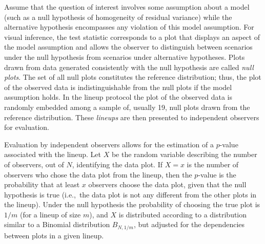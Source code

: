 \documentclass[12pt]{article}
\newcommand{\alnote}[1]{\todo[inline,color=green!40]{#1}} %
\begin{document}
Assume that  the question of interest involves  some assumption about a model (such as a null hypothesis of homogeneity of residual variance) while the alternative hypothesis  encompasses any violation of this model assumption. 
For visual inference, the test statistic corresponds to a plot  that displays an aspect of  the model assumption and allows the observer to distinguish between scenarios under the null hypothesis from scenarios under alternative hypotheses. 
Plots drawn from data generated consistently with the null hypothesis are called \emph{null plots}. The set of all null plots constitutes the reference distribution; thus, the plot of the observed data is indistinguishable from the null plots if the model assumption holds.
In the lineup protocol the plot of the observed data is randomly embedded
 among a sample of, usually 19, null plots drawn from the reference distribution.  These \emph{lineups} are then presented to independent observers for evaluation. 

Evaluation by independent observers  allows for the estimation of a $p$-value associated with the lineup.
 Let $X$ be the random variable describing  the number  of observers, out of $N$, identifying the data plot. 
If $X=x$ is  the number of observers who chose the data plot from the lineup, then the  $p$-value is  the probability that at least $x$ observers choose the data plot, given that the null hypothesis  is true (i.e.,~the  data plot is not any different from the other plots in the lineup). Under the null hypothesis the probability of choosing the true plot is $1/m$ (for a lineup of size $m$), and $X$ is distributed according to a distribution similar to a Binomial distribution $B_{N, 1/m}$, but adjusted for the dependencies between plots in a given lineup.
\citep[][introduced visual $p$-values. Details of their calculation for this LME model application are in Section~2.1 of the supplement.]{mahbub:2013}
\end{document}

